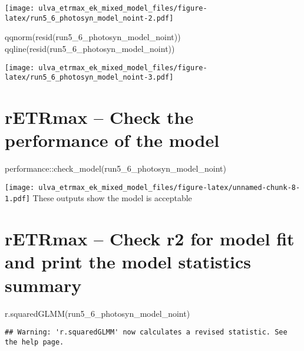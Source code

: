 \documentclass[
]{article}
\newenvironment{Shaded}{\begin{snugshade}}{\end{snugshade}}
\newcommand{\FunctionTok}[1]{\textcolor[rgb]{0.00,0.00,0.00}{#1}}
\newcommand{\NormalTok}[1]{#1}
\newcommand{\SpecialCharTok}[1]{\textcolor[rgb]{0.00,0.00,0.00}{#1}}
\begin{document}
\texttt{[image: ulva\_etrmax\_ek\_mixed\_model\_files/figure-latex/run5\_6\_photosyn\_model\_noint-2.pdf]}

\begin{Shaded}
\begin{Highlighting}[]
\FunctionTok{qqnorm}\NormalTok{(}\FunctionTok{resid}\NormalTok{(run5\_6\_photosyn\_model\_noint))}
\FunctionTok{qqline}\NormalTok{(}\FunctionTok{resid}\NormalTok{(run5\_6\_photosyn\_model\_noint))}
\end{Highlighting}
\end{Shaded}

\texttt{[image: ulva\_etrmax\_ek\_mixed\_model\_files/figure-latex/run5\_6\_photosyn\_model\_noint-3.pdf]}

\hypertarget{retrmax-check-the-performance-of-the-model}{%
\section{rETRmax -- Check the performance of the
model}\label{retrmax-check-the-performance-of-the-model}}

\begin{Shaded}
\begin{Highlighting}[]
\NormalTok{performance}\SpecialCharTok{::}\FunctionTok{check\_model}\NormalTok{(run5\_6\_photosyn\_model\_noint)}
\end{Highlighting}
\end{Shaded}

\texttt{[image: ulva\_etrmax\_ek\_mixed\_model\_files/figure-latex/unnamed-chunk-8-1.pdf]}
These outputs show the model is acceptable

\hypertarget{retrmax-check-r2-for-model-fit-and-print-the-model-statistics-summary}{%
\section{rETRmax -- Check r2 for model fit and print the model
statistics
summary}\label{retrmax-check-r2-for-model-fit-and-print-the-model-statistics-summary}}

\begin{Shaded}
\begin{Highlighting}[]
\FunctionTok{r.squaredGLMM}\NormalTok{(run5\_6\_photosyn\_model\_noint)}
\end{Highlighting}
\end{Shaded}

\begin{verbatim}
## Warning: 'r.squaredGLMM' now calculates a revised statistic. See the help page.
\end{verbatim}
\end{document}
